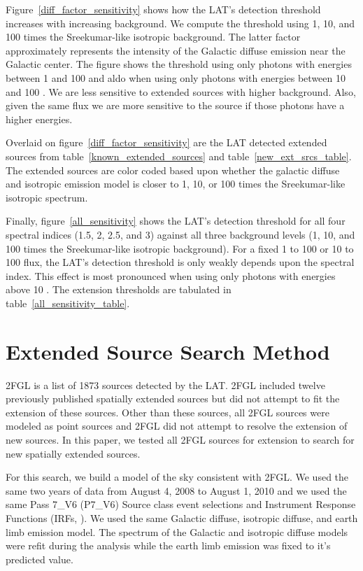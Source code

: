 \documentclass[12pt,preprint]{aastex}
\newcommand{\gev}{\text{GeV}\xspace}
\begin{document}
Figure~\ref{diff_factor_sensitivity} shows how the LAT's detection
threshold increases with increasing background. We compute the threshold
using 1, 10, and 100 times the Sreekumar-like isotropic background. The
latter factor approximately represents the intensity of the Galactic
diffuse emission near the Galactic center.  The figure shows the threshold
using only photons with energies between 1 \gev and 100 \gev and aldo
when using only photons with energies between 10 \gev and 100 \gev. We
are less sensitive to extended sources with higher background. Also,
given the same flux we are more sensitive to the source if those
photons have a higher energies.

Overlaid on figure~\ref{diff_factor_sensitivity} are the LAT
detected extended sources from table~\ref{known_extended_sources} and
table~\ref{new_ext_srcs_table}.  The extended sources are color coded
based upon whether the galactic diffuse and isotropic emission model is
closer to 1, 10, or 100 times the Sreekumar-like isotropic spectrum.

Finally, figure~\ref{all_sensitivity} shows the LAT's detection threshold
for all four spectral indices (1.5, 2, 2.5, and 3) against all three
background levels (1, 10, and 100 times the Sreekumar-like isotropic
background).  For a fixed 1 \gev to 100 \gev or 10 \gev to 100 \gev
flux, the LAT's detection threshold is only weakly depends upon the
spectral index.  This effect is most pronounced when using only photons
with energies above 10 \gev. The extension thresholds are tabulated in
table~\ref{all_sensitivity_table}.

\section{Extended Source Search Method}

2FGL is a list of 1873 \gev sources detected by the LAT.  2FGL included
twelve previously published spatially extended sources but did not
attempt to fit the extension of these sources. Other than these sources,
all 2FGL sources were modeled as point sources and 2FGL did not attempt to
resolve the extension of new sources.  In this paper, we tested all 2FGL
sources for extension to search for new spatially extended \gev sources.

For this search, we build a model of the
sky consistent with 2FGL.   We used the same two
years of data from August 4, 2008 to August 1, 2010 and we used the same
Pass 7\_V6 (P7\_V6) Source class event selections and 
Instrument Response Functions (IRFs, \cite{lat_on_orbit_psf}).  We used the same Galactic diffuse,
isotropic diffuse, and earth limb emission model. The spectrum of the
Galactic and isotropic diffuse models were refit during the analysis
while the earth limb emission was fixed to it's predicted value.
\end{document}
